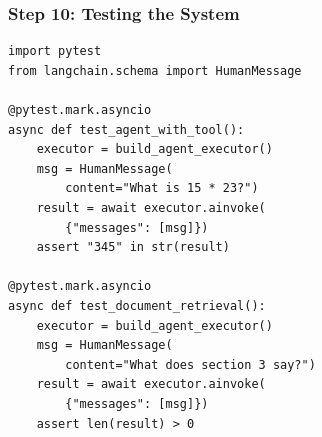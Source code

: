 \documentclass[aspectratio=169,11pt]{beamer}
\begin{document}
\begin{frame}[fragile]
  \frametitle{Step 10: Testing the System}

  \begin{lstlisting}
import pytest
from langchain.schema import HumanMessage

@pytest.mark.asyncio
async def test_agent_with_tool():
    executor = build_agent_executor()
    msg = HumanMessage(
        content="What is 15 * 23?")
    result = await executor.ainvoke(
        {"messages": [msg]})
    assert "345" in str(result)

@pytest.mark.asyncio
async def test_document_retrieval():
    executor = build_agent_executor()
    msg = HumanMessage(
        content="What does section 3 say?")
    result = await executor.ainvoke(
        {"messages": [msg]})
    assert len(result) > 0
  \end{lstlisting}
\end{frame}
\end{document}
